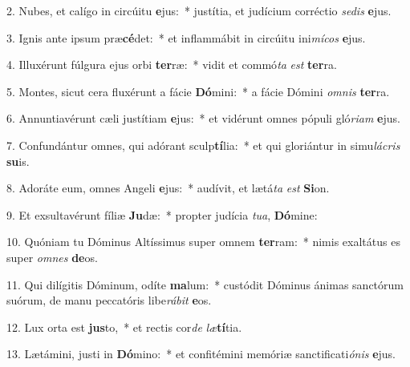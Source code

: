 2. Nubes, et calígo in circúitu \textbf{e}jus:~*  justítia, et judícium corréctio \textit{se}\textit{dis} \textbf{e}jus.\

3. Ignis ante ipsum præ\textbf{cé}det:~*  et inflammábit in circúitu ini\textit{mí}\textit{cos} \textbf{e}jus.\

4. Illuxérunt fúlgura ejus orbi \textbf{ter}ræ:~*  vidit et commó\textit{ta} \textit{est} \textbf{ter}ra.\

5. Montes, sicut cera fluxérunt a fácie \textbf{Dó}mini:~*  a fácie Dómini \textit{om}\textit{nis} \textbf{ter}ra.\

6. Annuntiavérunt cæli justítiam \textbf{e}jus:~*  et vidérunt omnes pópuli gló\textit{ri}\textit{am} \textbf{e}jus.\

7. Confundántur omnes, qui adórant sculp\textbf{tí}lia:~*  et qui gloriántur in simu\textit{lá}\textit{cris} \textbf{su}is.\

8. Adoráte eum, omnes Angeli \textbf{e}jus:~*  audívit, et lætá\textit{ta} \textit{est} \textbf{Si}on.\

9. Et exsultavérunt fíliæ \textbf{Ju}dæ:~*  propter judícia \textit{tu}\textit{a}, \textbf{Dó}mine:\

10. Quóniam tu Dóminus Altíssimus super omnem \textbf{ter}ram:~*  nimis exaltátus es super \textit{om}\textit{nes} \textbf{de}os.\

11. Qui dilígitis Dóminum, odíte \textbf{ma}lum:~*  custódit Dóminus ánimas sanctórum suórum, de manu peccatóris libe\textit{rá}\textit{bit} \textbf{e}os.\

12. Lux orta est \textbf{jus}to,~*  et rectis cor\textit{de} \textit{læ}\textbf{tí}tia.\

13. Lætámini, justi in \textbf{Dó}mino:~*  et confitémini memóriæ sanctificati\textit{ó}\textit{nis} \textbf{e}jus.\

